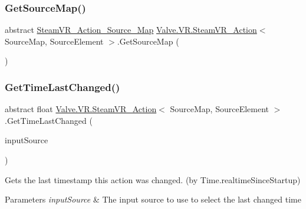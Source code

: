 \subsubsection{\texorpdfstring{GetSourceMap()}{GetSourceMap()}\hspace{0.1cm}{\footnotesize\ttfamily [2/2]}}
{\footnotesize\ttfamily abstract \mbox{\hyperlink{class_valve_1_1_v_r_1_1_steam_v_r___action___source___map}{Steam\+V\+R\+\_\+\+Action\+\_\+\+Source\+\_\+\+Map}} \mbox{\hyperlink{class_valve_1_1_v_r_1_1_steam_v_r___action}{Valve.\+V\+R.\+Steam\+V\+R\+\_\+\+Action}}$<$ Source\+Map, Source\+Element $>$.Get\+Source\+Map (\begin{DoxyParamCaption}{ }\end{DoxyParamCaption})\hspace{0.3cm}{\ttfamily [pure virtual]}}

\mbox{\label{class_valve_1_1_v_r_1_1_steam_v_r___action_ac8b7caef88740be5ec2ff78fd8fcbfad}} 
\subsubsection{\texorpdfstring{GetTimeLastChanged()}{GetTimeLastChanged()}}
{\footnotesize\ttfamily abstract float \mbox{\hyperlink{class_valve_1_1_v_r_1_1_steam_v_r___action}{Valve.\+V\+R.\+Steam\+V\+R\+\_\+\+Action}}$<$ Source\+Map, Source\+Element $>$.Get\+Time\+Last\+Changed (\begin{DoxyParamCaption}\item[{\mbox{\hyperlink{namespace_valve_1_1_v_r_a82e5bf501cc3aa155444ee3f0662853f}{Steam\+V\+R\+\_\+\+Input\+\_\+\+Sources}}}]{input\+Source }\end{DoxyParamCaption})\hspace{0.3cm}{\ttfamily [pure virtual]}}



Gets the last timestamp this action was changed. (by Time.\+realtime\+Since\+Startup) 


\begin{DoxyParams}{Parameters}
{\em input\+Source} & The input source to use to select the last changed time\\
\hline
\end{DoxyParams}


